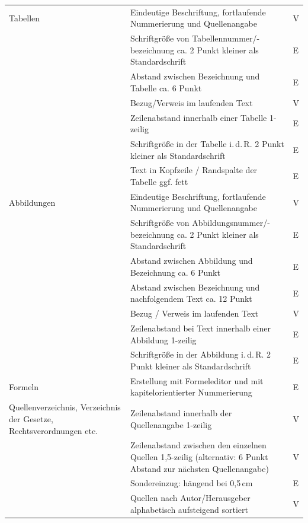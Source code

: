 \begin{longtable}{@{}p{}p{}
  >{\centering\arraybackslash}p{}@{}}
  Tabellen &
  Eindeutige Beschriftung, fortlaufende Nummerierung und Quellenangabe &
  V \\
  &
  Schriftgröße von Tabellennummer/-bezeichnung ca. 2 Punkt kleiner als
  Standardschrift &
  E \\
  &
  Abstand zwischen Bezeichnung und Tabelle ca. 6 Punkt &
  E \\
  &
  Bezug/Verweis im laufenden Text &
  V \\
  &
  Zeilenabstand innerhalb einer Tabelle 1-zeilig &
  E \\
  &
  Schriftgröße in der Tabelle i.\,d.\,R. 2 Punkt kleiner als
  Standardschrift &
  E \\
  &
  Text in Kopfzeile / Randspalte der Tabelle ggf. fett &
  E \\
  \midrule

  Abbildungen &
  Eindeutige Beschriftung, fortlaufende Nummerierung und Quellenangabe &
  V \\
  &
  Schriftgröße von Abbildungsnummer/-bezeichnung ca. 2 Punkt kleiner als
  Standardschrift &
  E \\
  &
  Abstand zwischen Abbildung und Bezeichnung ca. 6 Punkt &
  E \\
  &
  Abstand zwischen Bezeichnung und nachfolgendem Text ca. 12 Punkt &
  E \\
  &
  Bezug / Verweis im laufenden Text &
  V \\
  &
  Zeilenabstand bei Text innerhalb einer Abbildung 1-zeilig &
  E \\
  &
  Schriftgröße in der Abbildung i.\,d.\,R. 2 Punkt kleiner als
  Standardschrift &
  E \\
  \midrule

  Formeln &
  Erstellung mit Formeleditor und mit kapitelorientierter Nummerierung &
  E \\
  \midrule

  Quellenverzeichnis, Verzeichnis der Gesetze, Rechtsverordnungen etc. &
  Zeilenabstand innerhalb der Quellenangabe 1-zeilig &
  V \\
  &
  Zeilenabstand zwischen den einzelnen Quellen 1,5-zeilig
  (alternativ: 6 Punkt Abstand zur nächsten Quellenangabe) &
  V \\
  &
  Sondereinzug: hängend bei 0,5\,cm &
  E \\
  &
  Quellen nach Autor/Herausgeber alphabetisch aufsteigend sortiert &
  V \\
\end{longtable}
\endgroup
{}

